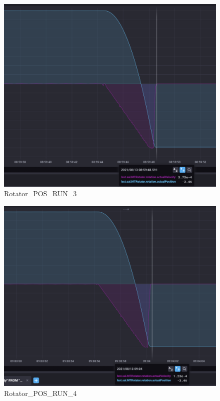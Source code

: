 \documentclass[SE,authoryear,toc, lsstdraft]{lsstdoc}
\begin{document}
\begin{figure}
  \includegraphics[width=\linewidth]{media/rotator_pos_3.png}
  \caption{Rotator\_POS\_RUN\_3}
  \label{fig:Rotator_POS_RUN_3}
\end{figure}

\begin{figure}
  \includegraphics[width=\linewidth]{media/rotator_pos_4.png}
  \caption{Rotator\_POS\_RUN\_4}
  \label{fig:Rotator_POS_RUN_4}
\end{figure}
\end{document}
